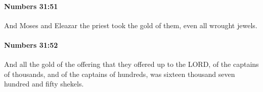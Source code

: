 		\paragraph{Numbers 31:51} %
			\label{NUMBERS-31-51}

			And Moses and Eleazar the priest took the gold of them, even all wrought jewels.


		\paragraph{Numbers 31:52} %
			\label{NUMBERS-31-52}

			And all the gold of the offering that they offered up to the LORD, of the captains of thousands, and of the captains of hundreds, was sixteen thousand seven hundred and fifty shekels.


